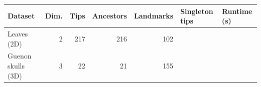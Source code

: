\begin{tabular}{lrrrrll}
\toprule
Dataset & Dim. & Tips & Ancestors & Landmarks & Singleton tips & Runtime (s) \\
\midrule
Leaves (2D) & 2 & 217 & 216 & 102 &  &  \\
Guenon skulls (3D) & 3 & 22 & 21 & 155 &  &  \\
\bottomrule
\end{tabular}
